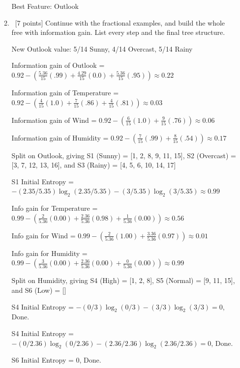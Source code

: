 \documentclass[12pt, fullpage,letterpaper]{article}
\begin{document}
\begin{enumerate}
\begin{enumerate}
\begin{framed}
	Best Feature: Outlook
\end{framed}

\item~[7 points] Continue with the fractional examples, and build the whole free with information gain. List every step and the final tree structure.  

\begin{framed}
	  \newline
	New Outlook value: {5/14 Sunny, 4/14 Overcast, 5/14 Rainy}
	
	\bigskip
	
	Information gain of Outlook = $0.92 - (\frac{5.36}{15}(.99) + \frac{4.29}{15}(0.0) + \frac{5.36}{15}(.95)) \approx 0.22 $
	
	Information gain of Temperature = $0.92 - (\frac{4}{15}(1.0) + \frac{7}{15}(.86) + \frac{4}{15}(.81)) \approx 0.03$
	
	Information gain of Wind = $0.92 - (\frac{6}{15}(1.0) + \frac{9}{15}(.76)) \approx 0.06 $
	
	Information gain of Humidity = $0.92 - (\frac{7}{15}(.99) + \frac{8}{15}(.54)) \approx 0.17 $
	
	Split on Outlook, giving S1 (Sunny) = [1, 2, 8, 9, 11, 15], S2 (Overcast) = [3, 7, 12, 13, 16], and S3 (Rainy) = [4, 5, 6, 10, 14, 17]
	
	\bigskip
	
	S1 Initial Entropy = $-(2.35/5.35)\log_2(2.35/5.35)-(3/5.35)\log_2(3/5.35) \approx 0.99 $
	
	Info gain for Temperature =$0.99 - (\frac{2}{5.36}(0.00) + \frac{2.36}{5.36}(0.98) + \frac{1}{5.36}(0.00)) \approx 0.56$
	
	Info gain for Wind = $0.99 - (\frac{2}{5.36}(1.00) + \frac{3.36}{5.36}(0.97)) \approx 0.01$
	
	Info gain for Humidity = $0.99 - (\frac{3}{5.36}(0.00) + \frac{2.36}{5.36}(0.00) + \frac{0}{5.36}(0.00)) \approx 0.99$
	
	Split on Humidity, giving S4 (High) = [1, 2, 8], S5 (Normal) = [9, 11, 15], and S6 (Low) = []
	
	\bigskip
	
	S4 Initial Entropy = $-(0/3)\log_2(0/3)-(3/3)\log_2(3/3) = 0 $, Done.
	
	S4 Initial Entropy = $-(0/2.36)\log_2(0/2.36)-(2.36/2.36)\log_2(2.36/2.36) = 0 $, Done.
	
	S6 Initial Entropy = $ 0 $, Done.
	
	\bigskip
	

\end{framed}
\end{enumerate}
\end{enumerate}
\end{document}

